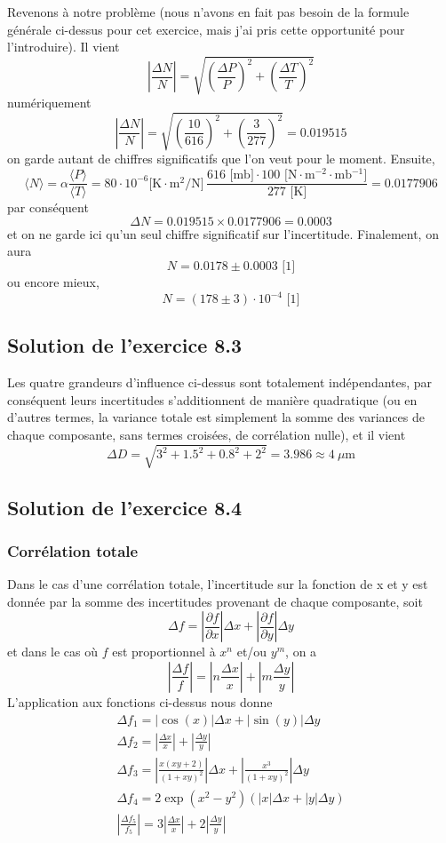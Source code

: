 Revenons à notre problème (nous n'avons en fait pas besoin de la formule générale ci-dessus pour cet exercice, mais j'ai pris cette opportunité pour l'introduire). Il vient
$$
\left|\frac{\Delta N}{N}\right|=
\sqrt{\left(\frac{\Delta P}{P}\right)^2+\left(\frac{\Delta T}{T}\right)^2}
$$
numériquement
$$
\left|\frac{\Delta N}{N}\right|=
\sqrt{\left(\frac{10}{616}\right)^2+\left(\frac{3}{277}\right)^2}=0.019515
$$
on garde autant de chiffres significatifs que l'on veut pour le moment. Ensuite,
$$
\langle N \rangle=\alpha\frac{\langle P \rangle}{\langle T \rangle}
=80\cdot10^{-6}\text{[K$\cdot$m$^2$/N]}\,\frac{\text{616 [mb]$\cdot$100 [N$\cdot$m$^{-2}\cdot$mb$^{-1}$]}}{\text{277 [K]}}=0.0177906
$$
par conséquent
$$
\Delta N=0.019515\times0.0177906=0.0003
$$
et on ne garde ici qu'un seul chiffre significatif sur l'incertitude. Finalement, on aura
$$
N=0.0178\pm0.0003\text{  [1]}
$$
ou encore mieux,
$$
N=(178\pm3)\cdot 10^{-4}\text{  [1]}
$$

\subsection*{Solution de l'exercice 8.3}

Les quatre grandeurs d'influence ci-dessus sont totalement indépendantes, par conséquent leurs incertitudes s'additionnent de manière quadratique (ou en d'autres termes, la variance totale est simplement la somme des variances de chaque composante, sans termes croisées, de corrélation nulle), et il vient
$$
\Delta D=\sqrt{3^2+1.5^2+0.8^2+2^2}=3.986\approx 4\ \mu\text{m}
$$

\subsection*{Solution de l'exercice 8.4}

\subsubsection*{Corrélation totale}

Dans le cas d'une corrélation totale, l'incertitude sur la fonction de x et y est donnée par la somme des incertitudes provenant de chaque composante, soit
$$
\Delta f=\left|\frac{\partial f}{\partial x}\right|\Delta x+
\left|\frac{\partial f}{\partial y}\right|\Delta y
$$
et dans le cas où $f$ est proportionnel à $x^n$ et/ou $y^m$, on a
$$
\left|\frac{\Delta f}{f}\right|=\left|n\frac{\Delta x}{x}\right|+\left|m\frac{\Delta y}{y}\right|
$$
L'application aux fonctions ci-dessus nous donne
\begin{gather*}
\Delta f_1=|\cos{(x)}|\Delta x+|\sin{(y)}|\Delta y\\
\Delta f_2=\left|\frac{\Delta x}{x}\right|+\left|\frac{\Delta y}{y}\right|\\
\Delta f_3=\left|\frac{x(xy+2)}{(1+xy)^2}\right|\Delta x+
\left|\frac{x^3}{(1+xy)^2}\right|\Delta y\\
\Delta f_4=2\exp(x^2-y^2)(|x|\Delta x+|y|\Delta y)\\
\left|\frac{\Delta f_5}{f_5}\right|=3\left|\frac{\Delta x}{x}\right|+2\left|\frac{\Delta y}{y}\right|
\end{gather*}

